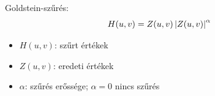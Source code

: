 \documentclass[aspectratio=169]{beamer}
\begin{document}
\begin{frame}{\ft}
    Goldstein-szűrés:
    \[
        H(u,v) = Z(u,v) \left|Z(u,v)\right|^{\alpha}
    \]
    \begin{itemize}
        \item $H(u,v)$: szűrt értékek
        \item $Z(u,v)$: eredeti értékek
        \item $\alpha$: szűrés erőssége; $\alpha = 0$ nincs szűrés
    \end{itemize}
\end{frame}

%
\end{document}
